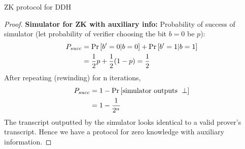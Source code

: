 \begin{solution}{ZK protocol for DDH}
\begin{proof}
    \textbf{Simulator for ZK with auxiliary info:}
    Probability of success of simulator (let probability of verifier choosing the bit $b = 0$ be $p$):
    \begin{equation}
        \begin{split}
            P_{succ} &= \Pr\left[ b'=0|b=0 \right] + \Pr\left[ b'=1|b=1 \right]\\
                     &= \frac{1}{2}p+\frac{1}{2}(1-p) = \frac{1}{2}
        \end{split}
    \end{equation}
    After repeating (rewinding) for n iterations,
    \begin{equation}
        \begin{split}
            P_{succ} &= 1 - \Pr\left[ \text{simulator outputs }\perp \right]\\
                     &= 1 - \frac{1}{2^n}
        \end{split}
    \end{equation}
    The transcript outputted by the simulator looks identical to a valid prover's transcript. Hence we have a protocol for zero knowledge with auxiliary information.
    \end{proof}
\end{solution}
